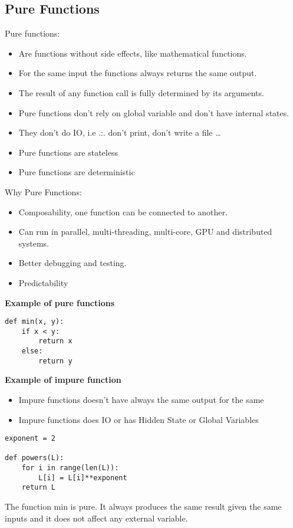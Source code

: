 \documentclass[11pt]{article}
\begin{document}
\subsection{Pure Functions}
\label{sec-1-4}

Pure functions:

\begin{itemize}
\item Are functions without side effects, like mathematical functions.
\item For the same input the functions always returns the same output.
\item The result of any function call is fully determined by its arguments.
\item Pure functions don't rely on global variable and don't have internal states.
\item They don't do IO, i.e .:. don't print, don't write a file \ldots{}
\item Pure functions are stateless
\item Pure functions are deterministic
\end{itemize}

Why Pure Functions:

\begin{itemize}
\item Composability, one function can be connected to another.
\item Can run in parallel, multi-threading, multi-core, GPU and distributed systems.
\item Better debugging and testing.
\item Predictability
\end{itemize}

\textbf{Example of pure functions}

\begin{verbatim}
def min(x, y):
    if x < y:
        return x
    else:
        return y
\end{verbatim}


\textbf{Example of impure function}

\begin{itemize}
\item Impure functions doesn't have always the same output for the same
\item Impure functions does IO or has Hidden State or Global Variables
\end{itemize}

\begin{verbatim}
exponent = 2

def powers(L):
    for i in range(len(L)):
        L[i] = L[i]**exponent
    return L
\end{verbatim}
The function min is pure. It always produces the same result given 
the same inputs and it does not affect any external variable.
\end{document}
